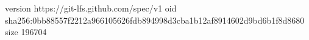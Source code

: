 version https://git-lfs.github.com/spec/v1
oid sha256:0bb88557f2212a966105626fdb894998d3cba1b12af8914602d9bd6b1f8d8680
size 196704
